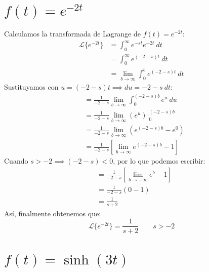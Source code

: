 \documentclass[12pt, a4paper]{article}
\begin{document}
\section{\texorpdfstring{\(f(t)=e^{-2t}\)}{f (t) = e (-2t)}}

Calculamos la transformada de Lagrange de \(f(t) = e^{-2t}\):
\begin{align*}
	\mathcal{L}\{e^{-2t}\} &= \int_{0}^{\infty} e^{-st} e^{-2t}\ dt \\
	&= \int_{0}^{\infty} e^{(-2-s)t} \ dt \\
	&= \lim_{b \to \infty} \int_{0}^{b} e^{(-2-s)t} \ dt
\end{align*}
Sustituyamos con \(u = (-2-s) t \implies du = -2-s\ dt\):
\begin{align*}
	&= \frac{1}{-2-s} \lim_{b \to \infty} \int_{0}^{(-2-s)b} e^{u} \ du \\
	&= \frac{1}{-2-s} \lim_{b \to \infty} \left. \left( e^{u} \right)  \right|_{0}^{(-2-s)b} \\
	&= \frac{1}{-2-s} \lim_{b \to \infty} \left( e^{(-2-s)b} - e^{0} \right) \\
	&= \frac{1}{-2-s} \left[ \lim_{b \to \infty} e^{(-2-s)b} - 1 \right]
\end{align*}
Cuando \(s > -2 \implies (-2-s) < 0\), por lo que podemos escribir:
\begin{align*}
	&= \frac{1}{-2-s} \left[ \lim_{b \to -\infty} e^{b} - 1 \right] \\
	&= \frac{1}{-2-s} (0 - 1) \\
	&= \frac{1}{s+2}
\end{align*}
Así, finalmente obtenemos que:
\[
	\mathcal{L}\{e^{-2t}\} = \frac{1}{s+2} \qquad s > -2
\]

\setcounter{section}{13}
\section{\texorpdfstring{\(f(t)=\sinh(3t)\)}{f (t) = sinh (3t)}}
\end{document}
